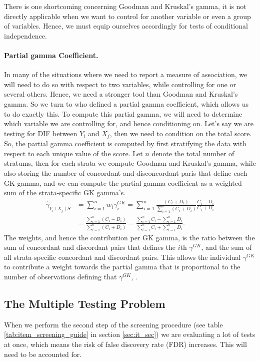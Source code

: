 \documentclass[a4project,12pt]{article}
\theoremstyle{examplestyle}
\theoremstyle{defstyle}
\theoremstyle{thmstyle}
\begin{document}
There is one shortcoming concerning Goodman and Kruskal's gamma, it is not directly applicable when we want to control for another variable or even a group of variables. Hence, we must equip ourselves accordingly for tests of conditional independence. 

\paragraph{Partial gamma Coefficient.} In many of the situations where we need to report a measure of association, we will need to do so with respect to two variables, while controlling for one or several others. Hence, we need a stronger tool than Goodman and Kruskal's gamma. So we turn to \cite{Davis1967} who defined a partial gamma coefficient, which allows us to do exactly this. To compute this partial gamma, we will need to determine which variable we are controlling for, and hence conditioning on. Let's say we are testing for DIF between $Y_i$ and $X_j$, then we need to condition on the total score. So, the partial gamma coefficient is computed by first stratifying the data with respect to each unique value of the score. Let $n$ denote the total number of stratums, then for each strata we compute Goodman and Kruskal's gamma, while also storing the number of concordant and disconcordant paris that define each GK gamma, and we can compute the partial gamma coefficient as a weighted sum of the strata-specific GK gamma's. 
\begin{align}
    \hat{\gamma}_{Y_i\bot X_j\mid S} &= \sum_{i=1}^n w_i\gamma^{GK}_i = \sum_{i=1}^n\frac{(C_i+D_i)}{\sum_{i=1}^n(C_i+D_i)}\frac{C_i-D_i}{C_i+D_i} \\
    &= \frac{\sum_{i=1}^n(C_i-D_i)}{\sum_{i=1}^n(C_i+D_i)} = \frac{\sum_{i=1}^nC_i-\sum_{i=1}^nD_i}{\sum_{i=1}^nC_i+\sum_{i=1}^nD_i}.
\end{align}
The weights, and hence the contribution per GK gamma, is the ratio between the sum of concordant and discordant pairs that defines the $i$th $\gamma^{GK}$, and the sum of all strata-specific concordant and discordant pairs. This allows the individual $\gamma^{GK}$ to contribute a weight towards the partial gamma that is proportional to the number of observations defining that $\gamma^{GK}$, \cite{agresti1984analysis}.  



\subsection{The Multiple Testing Problem}
When we perform the second step of the screening procedure (see table \ref{tab:item_screening_guide} in section \ref{sec:it_sec}) we are evaluating a lot of tests at once, which means the risk of false discovery rate (FDR) increases. This will need to be accounted for. 
\end{document}
